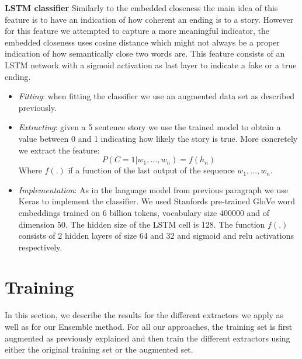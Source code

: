 \documentclass{article}
\begin{document}
\textbf{LSTM classifier} Similarly to the embedded closeness the main idea of this feature is to have an indication of how coherent an ending is to a story. However for this feature we attempted to capture a more meaningful indicator, the embedded closeness uses cosine distance which might not always be a proper indication of how semantically close two words are. This feature consists of an LSTM network with a sigmoid activation as last layer to indicate a fake or a true ending.
\begin{itemize}
	\item \textit{Fitting}: when fitting the classifier we use an augmented data set as described previously.
	\item \textit{Extracting}: given a 5 sentence story we use the trained model to obtain a value between 0 and 1 indicating how likely the story is true. More concretely we extract the feature:
	\begin{equation}
		P(C = 1| w_1,...,w_n) = f(h_n)
	\end{equation}
	Where $f(.)$ if a function of the last output of the sequence $w_1,...,w_n$.
	\item \textit{Implementation}: As in the language model from previous paragraph we use Keras to implement the classifier. We used Stanfords pre-trained GloVe word embeddings trained on 6 billion tokens, vocabulary size $400000$ and of dimension 50. The hidden size of the LSTM cell is 128. The function $f(.)$ consists of 2 hidden layers of size 64 and 32 and sigmoid and relu activations respectively.
\end{itemize}

\section{Training}
\label{sec:training}

In this section, we describe the results for the different extractors we apply
 as well as for our Ensemble method. For all our
approaches, the training set is first augmented as previously explained and then
train the different extractors using either the original training set or the augmented
set.
\end{document}
